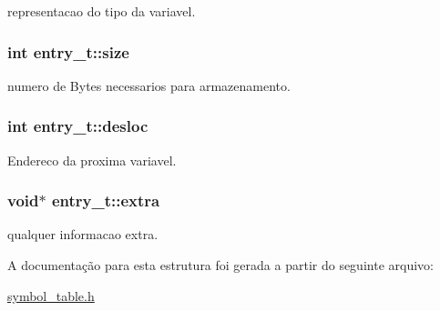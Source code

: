 representacao do tipo da variavel. \hypertarget{structentry__t_67460ae77b6a4433d48f7736ee6a500a}{
\subsubsection{\setlength{\rightskip}{0pt plus 5cm}int {\bf entry\_\-t::size}}}
\label{structentry__t_67460ae77b6a4433d48f7736ee6a500a}


numero de Bytes necessarios para armazenamento. \hypertarget{structentry__t_bc62dec01315bbb72bff20ce69d8ef37}{
\subsubsection{\setlength{\rightskip}{0pt plus 5cm}int {\bf entry\_\-t::desloc}}}
\label{structentry__t_bc62dec01315bbb72bff20ce69d8ef37}


Endereco da proxima variavel. \hypertarget{structentry__t_6f7a7b18bd57fafba8d1f2d257ac3863}{
\subsubsection{\setlength{\rightskip}{0pt plus 5cm}void$\ast$ {\bf entry\_\-t::extra}}}
\label{structentry__t_6f7a7b18bd57fafba8d1f2d257ac3863}


qualquer informacao extra. 

A documentação para esta estrutura foi gerada a partir do seguinte arquivo:\begin{CompactItemize}
\item 
\hyperlink{symbol__table_8h}{symbol\_\-table.h}\end{CompactItemize}
